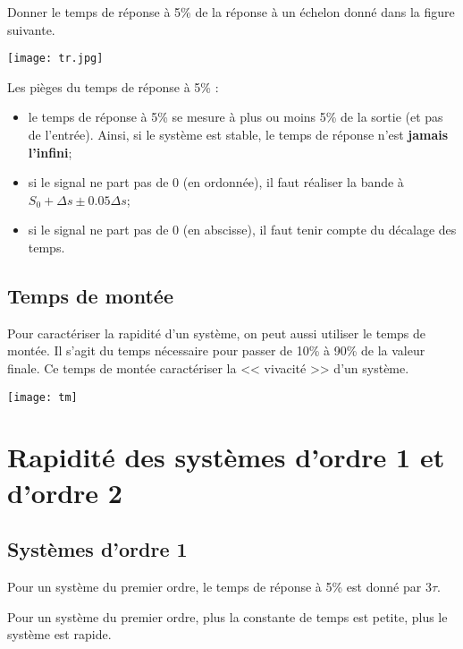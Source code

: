 \begin{exemple}
Donner le temps de réponse à 5\% de la réponse à un échelon donné dans la figure suivante. 


\begin{minipage}[c]{.5\linewidth}
\begin{center}
%
\texttt{[image: tr.jpg]}
\end{center}
\end{minipage} \hfill
\begin{minipage}[c]{.4\linewidth}
Les pièges du temps de réponse à 5\% :
\begin{itemize}
\item le temps de réponse à 5\% se mesure à plus ou moins 5\% de la sortie (et pas de l'entrée). Ainsi, si le système est stable, le temps de réponse n'est \textbf{jamais l'infini};
\item si le signal ne part pas de 0 (en ordonnée), il faut réaliser la bande à $S_0+\Delta s \pm 0.05\Delta s$;
\item si le signal ne part pas de 0 (en abscisse), il faut tenir compte du décalage des temps.
\end{itemize}
\end{minipage} 
\end{exemple}

\subsection{Temps de montée}


\begin{minipage}[c]{.48\linewidth}
Pour caractériser la rapidité d'un système, on peut aussi utiliser le temps de montée. Il s'agit du temps nécessaire pour passer de 10\% à 90\% de la valeur finale. Ce temps de montée caractériser la << vivacité >> d'un système. 
\end{minipage} \hfill
\begin{minipage}[c]{.4\linewidth}
\begin{center}
%
\texttt{[image: tm]}
\end{center}
\end{minipage} 
\section{Rapidité des systèmes d'ordre 1 et d'ordre 2}
\subsection{Systèmes d'ordre 1}
Pour un système du premier ordre, le temps de réponse à 5\% est donné par $3\tau$.
\begin{resultat}
Pour un système du premier ordre, plus la constante de temps est petite, plus le système est rapide.
\end{resultat}

